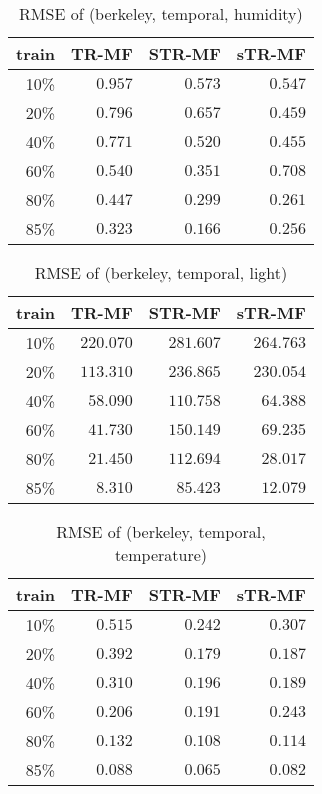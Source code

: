 \begin{table} [htbp]
\setlength{\tabcolsep}{2pt}
\centering
\caption{RMSE of (berkeley, temporal, humidity)}
\label{table:spatial_temporal_hum}
\begin{tabular} {r | r r r}
	train	& TR-MF	&	STR-MF	&	sTR-MF	\\ \hline
	10\% & $ 0.957 $ & $ 0.573 $ & $ \mathbf{ 0.547 } $ \\
	20\% & $ 0.796 $ & $ 0.657 $ & $ \mathbf{ 0.459 } $ \\
	40\% & $ 0.771 $ & $ 0.520 $ & $ \mathbf{ 0.455 } $ \\
	60\% & $ 0.540 $ & $ \mathbf{ 0.351 } $ & $ 0.708 $ \\
	80\% & $ 0.447 $ & $ 0.299 $ & $ \mathbf{ 0.261 } $ \\
	85\% & $ 0.323 $ & $ \mathbf{ 0.166 } $ & $ 0.256 $ \\
\end{tabular}
\end{table}

\begin{table} [htbp]
\setlength{\tabcolsep}{2pt}
\centering
\caption{RMSE of (berkeley, temporal, light)}
\label{table:spatial_temporal_light}
\begin{tabular} {r | r r r}
	train	& TR-MF	&	STR-MF	&	sTR-MF	\\ \hline
	10\% & $ \mathbf{ 220.070 } $ & $ 281.607 $ & $ 264.763 $ \\
	20\% & $ \mathbf{ 113.310 } $ & $ 236.865 $ & $ 230.054 $ \\
	40\% & $ \mathbf{ 58.090 } $ & $ 110.758 $ & $ 64.388 $ \\
	60\% & $ \mathbf{ 41.730 } $ & $ 150.149 $ & $ 69.235 $ \\
	80\% & $ \mathbf{ 21.450 } $ & $ 112.694 $ & $ 28.017 $ \\
	85\% & $ \mathbf{ 8.310 } $ & $ 85.423 $ & $ 12.079 $ \\
\end{tabular}
\end{table}


\begin{table} [htbp]
\setlength{\tabcolsep}{2pt}
\centering
\caption{RMSE of (berkeley, temporal, temperature)}
\label{table:spatial_temporal_tem}
\begin{tabular} {r | r r r}
	train	& TR-MF	&	STR-MF	&	sTR-MF	\\ \hline
	10\% & $ 0.515 $ & $ \mathbf{ 0.242 } $ & $ 0.307 $ \\
	20\% & $ 0.392 $ & $ \mathbf{ 0.179 } $ & $ 0.187 $ \\
	40\% & $ 0.310 $ & $ 0.196 $ & $ \mathbf{ 0.189 } $ \\
	60\% & $ 0.206 $ & $ \mathbf{ 0.191 } $ & $ 0.243 $ \\
	80\% & $ 0.132 $ & $ \mathbf{ 0.108 } $ & $ 0.114 $ \\
	85\% & $ 0.088 $ & $ \mathbf{ 0.065 } $ & $ 0.082 $ \\
\end{tabular}
\end{table}

